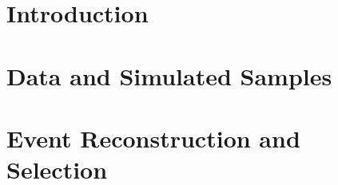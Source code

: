 \documentclass[UKenglish,texlive=2013]{\ATLASLATEXPATH atlasdoc}
\begin{document}
\maketitle



%
\section{Introduction}
\label{sec:intro}



% 

\section{Data and Simulated Samples}
\label{sec:samples}


\section{Event Reconstruction and Selection}
\label{sec:evtsel}

\end{document}
